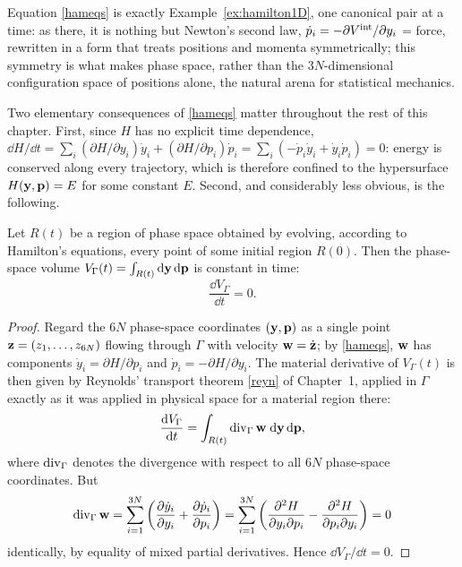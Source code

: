 \begin{remark}
	Equation \eqref{hameqs} is exactly Example~\ref{ex:hamilton1D}, one canonical pair at a time: as there, it is nothing but Newton's second law, $\dot p_i = -\partial V^{\rm int}/\partial y_i$ = force, rewritten in a form that treats positions and momenta symmetrically; this symmetry is what makes phase space, rather than the $3N$-dimensional configuration space of positions alone, the natural arena for statistical mechanics.
\end{remark}

Two elementary consequences of \eqref{hameqs} matter throughout the rest of this chapter. First, since $H$ has no explicit time dependence, $\dd H/\dd t = \sum_i(\partial H/\partial y_i)\dot y_i + (\partial H/\partial p_i)\dot p_i = \sum_i(-\dot p_i\dot y_i+\dot y_i\dot p_i)=0$: energy is conserved along every trajectory, which is therefore confined to the hypersurface $H(\mathbf{y},\mathbf{p})=E$ for some constant $E$. Second, and considerably less obvious, is the following.

\begin{theorem}\label{thm:liouville}
	Let $R(t)$ be a region of phase space obtained by evolving, according to Hamilton's equations, every point of some initial region $R(0)$. Then the phase-space volume $V_\Gamma(t)=\int_{R(t)}\mathrm{d}\mathbf{y}\,\mathrm{d}\mathbf{p}$ is constant in time:
	\begin{equation}\label{liouvillevol}
		\frac{\dd V_\Gamma}{\dd t} = 0.
	\end{equation}
\end{theorem}

\begin{proof}
	Regard the $6N$ phase-space coordinates $(\mathbf{y},\mathbf{p})$ as a single point $\mathbf{z}=(z_1,\ldots,z_{6N})$ flowing through $\Gamma$ with velocity $\mathbf{w}=\dot{\mathbf{z}}$; by \eqref{hameqs}, $\mathbf{w}$ has components $\dot y_i=\partial H/\partial p_i$ and $\dot p_i=-\partial H/\partial y_i$. The material derivative of $V_\Gamma(t)$ is then given by Reynolds' transport theorem \eqref{reyn} of Chapter~1, applied in $\Gamma$ exactly as it was applied in physical space for a material region there:
	\begin{equation}
		\frac{\mathrm{d} V_\Gamma}{\mathrm{d} t} = \int_{R(t)} \operatorname{div}_\Gamma\mathbf{w} \;\mathrm{d}\mathbf{y}\,\mathrm{d}\mathbf{p},
	\end{equation}
	where $\operatorname{div}_\Gamma$ denotes the divergence with respect to all $6N$ phase-space coordinates. But
	\begin{equation}
		\operatorname{div}_\Gamma\mathbf{w} = \sum_{i=1}^{3N}\left(\frac{\partial \dot y_i}{\partial y_i}+\frac{\partial \dot p_i}{\partial p_i}\right) = \sum_{i=1}^{3N}\left(\frac{\partial^2H}{\partial y_i\partial p_i}-\frac{\partial^2H}{\partial p_i\partial y_i}\right)=0
	\end{equation}
	identically, by equality of mixed partial derivatives. Hence $\dd V_\Gamma/\dd t=0$.
\end{proof}

